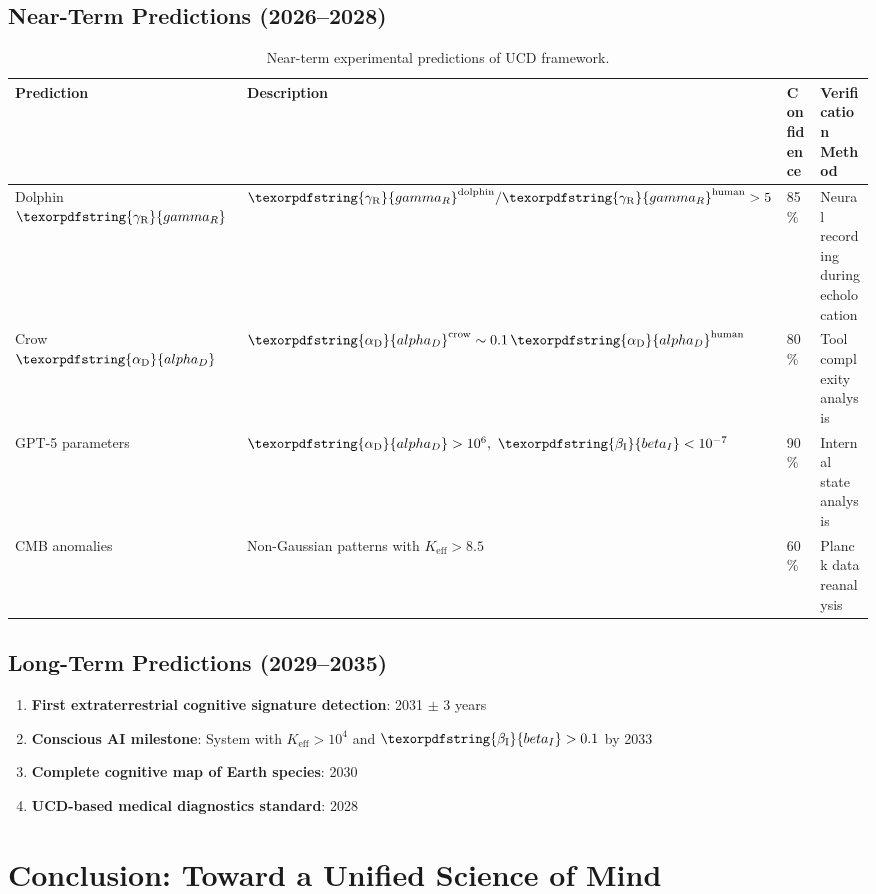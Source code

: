 \documentclass[12pt,a4paper]{article}
\DeclareRobustCommand{\alD}{\texorpdfstring{\ensuremath{\alpha_{\mathrm{D}}}}{alpha_D}}
\DeclareRobustCommand{\beI}{\texorpdfstring{\ensuremath{\beta_{\mathrm{I}}}}{beta_I}}
\DeclareRobustCommand{\gaR}{\texorpdfstring{\ensuremath{\gamma_{\mathrm{R}}}}{gamma_R}}
\newcommand{\Ke}{K_{\mathrm{eff}}}
\begin{document}
	\subsection{Near-Term Predictions (2026--2028)}
	
	\begin{table}[ht]
		\centering
		\begin{tabular}{lp{}lp{}}
			\toprule
			\textbf{Prediction} & \textbf{Description} & \textbf{Confidence} & \textbf{Verification Method} \\
			\midrule
			Dolphin \(\gaR\) & \(\gaR^{\mathrm{dolphin}}/\gaR^{\mathrm{human}} > 5\) & 85\% & Neural recording during echolocation \\
			Crow \(\alD\) & \(\alD^{\mathrm{crow}} \sim 0.1\,\alD^{\mathrm{human}}\) & 80\% & Tool complexity analysis \\
			GPT-5 parameters & \(\alD > 10^6,\ \beI < 10^{-7}\) & 90\% & Internal state analysis \\
			CMB anomalies & Non-Gaussian patterns with \(\Ke > 8.5\) & 60\% & Planck data reanalysis \\
			\bottomrule
		\end{tabular}
		\caption{Near-term experimental predictions of UCD framework.}
		\label{tab:near-term-predictions}
	\end{table}
	
	\subsection{Long-Term Predictions (2029--2035)}
	
	\begin{enumerate}
		\item \textbf{First extraterrestrial cognitive signature detection}: 2031 \(\pm\) 3 years
		\item \textbf{Conscious AI milestone}: System with \(\Ke > 10^4\) and \(\beI > 0.1\) by 2033
		\item \textbf{Complete cognitive map of Earth species}: 2030
		\item \textbf{UCD-based medical diagnostics standard}: 2028
	\end{enumerate}
	
	\section{Conclusion: Toward a Unified Science of Mind}
	
\end{document}
